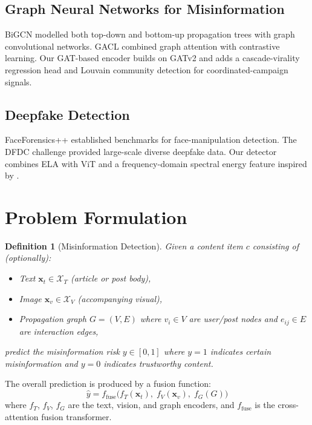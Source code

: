 \documentclass[11pt,a4paper]{article}
\newtheorem{definition}{Definition}
\begin{document}
\subsection{Graph Neural Networks for Misinformation}
BiGCN \cite{bian2020rumor} modelled both top-down and bottom-up propagation
trees with graph convolutional networks. GACL \cite{sun2022rumor} combined
graph attention with contrastive learning. Our GAT-based encoder builds on
GATv2 \cite{brody2021attentive} and adds a cascade-virality regression head
and Louvain community detection for coordinated-campaign signals.

\subsection{Deepfake Detection}
FaceForensics++ \cite{rossler2019faceforensics} established benchmarks for
face-manipulation detection. The DFDC challenge \cite{dolhansky2020deepfake}
provided large-scale diverse deepfake data. Our detector combines ELA with
ViT \cite{dosovitskiy2020vit} and a frequency-domain spectral energy
feature inspired by \cite{frank2020leveraging}.

\section{Problem Formulation}
\label{sec:problem}

\begin{definition}[Misinformation Detection]
Given a content item $c$ consisting of (optionally):
\begin{itemize}
  \item Text $\mathbf{x}_t \in \mathcal{X}_T$ (article or post body),
  \item Image $\mathbf{x}_v \in \mathcal{X}_V$ (accompanying visual),
  \item Propagation graph $G = (V, E)$ where $v_i \in V$ are user/post
    nodes and $e_{ij} \in E$ are interaction edges,
\end{itemize}
predict the misinformation risk $y \in [0, 1]$ where $y = 1$ indicates
certain misinformation and $y = 0$ indicates trustworthy content.
\end{definition}

The overall prediction is produced by a fusion function:
\begin{equation}
  \hat{y} = f_\text{fuse}\!\bigl(
    f_T(\mathbf{x}_t),\;
    f_V(\mathbf{x}_v),\;
    f_G(G)
  \bigr)
  \label{eq:fusion}
\end{equation}
where $f_T$, $f_V$, $f_G$ are the text, vision, and graph encoders,
and $f_\text{fuse}$ is the cross-attention fusion transformer.
\end{document}
